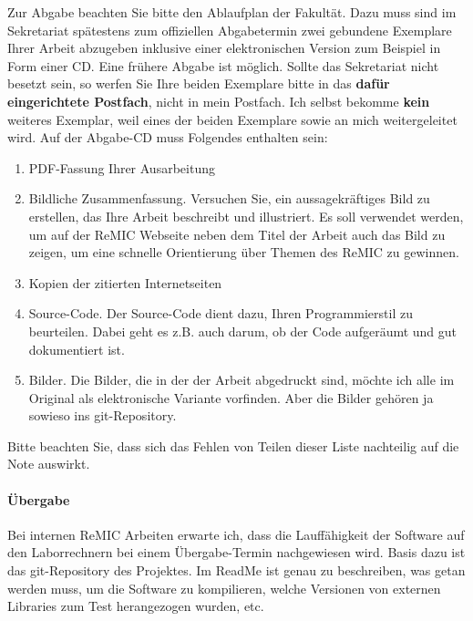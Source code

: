 Zur Abgabe beachten Sie bitte den Ablaufplan der Fakultät.
Dazu muss sind im Sekretariat spätestens zum offiziellen Abgabetermin zwei gebundene Exemplare Ihrer Arbeit abzugeben inklusive einer elektronischen Version zum Beispiel in Form einer CD.
Eine frühere Abgabe ist möglich.
Sollte das Sekretariat nicht besetzt sein, so werfen Sie Ihre beiden Exemplare bitte in das \textbf{dafür eingerichtete Postfach}, nicht in mein Postfach.
Ich selbst bekomme \textbf{kein} weiteres Exemplar, weil eines der beiden Exemplare sowie an mich weitergeleitet wird.
Auf der Abgabe-CD muss Folgendes enthalten sein:
\begin{enumerate}
\item PDF-Fassung Ihrer Ausarbeitung
\item Bildliche Zusammenfassung. Versuchen Sie, ein aussagekräftiges Bild zu erstellen, das Ihre Arbeit beschreibt und illustriert.
Es soll verwendet werden, um auf der ReMIC Webseite neben dem Titel der Arbeit auch das Bild zu zeigen, um eine schnelle Orientierung über Themen des ReMIC zu gewinnen.
\item Kopien der zitierten Internetseiten
\item Source-Code. Der Source-Code dient dazu, Ihren Programmierstil zu beurteilen. Dabei geht es z.B. auch darum, ob der Code aufgeräumt und gut dokumentiert ist.
\item Bilder. Die Bilder, die in der der Arbeit abgedruckt sind, möchte ich alle im Original als elektronische Variante vorfinden.
Aber die Bilder gehören ja sowieso ins git-Repository.
\end{enumerate}
Bitte beachten Sie, dass sich das Fehlen von Teilen dieser Liste nachteilig auf die Note auswirkt.

\paragraph{Übergabe} Bei internen ReMIC Arbeiten erwarte ich, dass die Lauffähigkeit der Software auf den Laborrechnern bei einem Übergabe-Termin nachgewiesen wird.
Basis dazu ist das git-Repository des Projektes.
Im ReadMe ist  genau zu beschreiben, was getan werden muss, um die Software zu kompilieren, welche Versionen von externen Libraries zum Test herangezogen wurden, etc.


